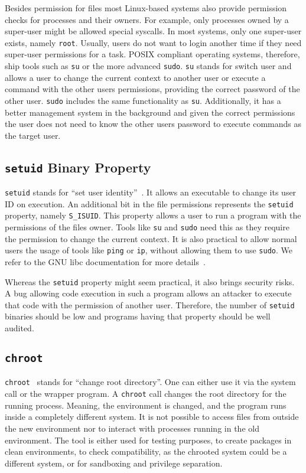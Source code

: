 Besides permission for files most Linux-based systems also provide permission
checks for processes and their owners. For example, only processes owned by a
super-user might be allowed special syscalls. In most systems, only one
super-user exists, namely \texttt{root}. Usually, users do not want to login
another time if they need super-user permissions for a task. POSIX compliant
operating systems, therefore, ship tools such as \texttt{su} or the more
advanced \texttt{sudo}. \texttt{su} stands for switch user and allows a user to
change the current context to another user or execute a command with the other
user\textquotesingle s permissions, providing the correct password of the other
user. \texttt{sudo} includes the same functionality as \texttt{su}.
Additionally, it has a better management system in the background and given the
correct permissions the user does not need to know the other
user\textquotesingle s password to execute commands as the target user.

\subsection{\texttt{setuid} Binary Property}

\texttt{setuid} stands for ``set user identity''~\cite{ogroupsetuid}. It allows
an executable to change its user ID on execution. An additional bit in the file
permissions represents the \texttt{setuid} property, namely \texttt{S\_ISUID}.
This property allows a user to run a program with the permissions of the
file\textquotesingle s owner. Tools like \texttt{su} and \texttt{sudo} need this
as they require the permission to change the current context. It is also
practical to allow normal users the usage of tools like \texttt{ping} or
\texttt{ip}, without allowing them to use \texttt{sudo}. We refer to the GNU
libc documentation for more details~\cite{libcpermission}.

Whereas the \texttt{setuid} property might seem practical, it also brings
security risks. A bug allowing code execution in such a program allows an
attacker to execute that code with the permission of another user. Therefore,
the number of \texttt{setuid} binaries should be low and programs having that
property should be well audited.

\subsection{\texttt{chroot}}

\texttt{chroot}~\cite{ogroupchroot} stands for ``change root directory''. One
can either use it via the system call or the wrapper program. A \texttt{chroot}
call changes the root directory for the running process. Meaning, the
environment is changed, and the program runs inside a completely different
system. It is not possible to access files from outside the new environment nor
to interact with processes running in the old environment. The tool is either
used for testing purposes, to create packages in clean environments, to check
compatibility, as the chrooted system could be a different system, or for
sandboxing and privilege separation. 

